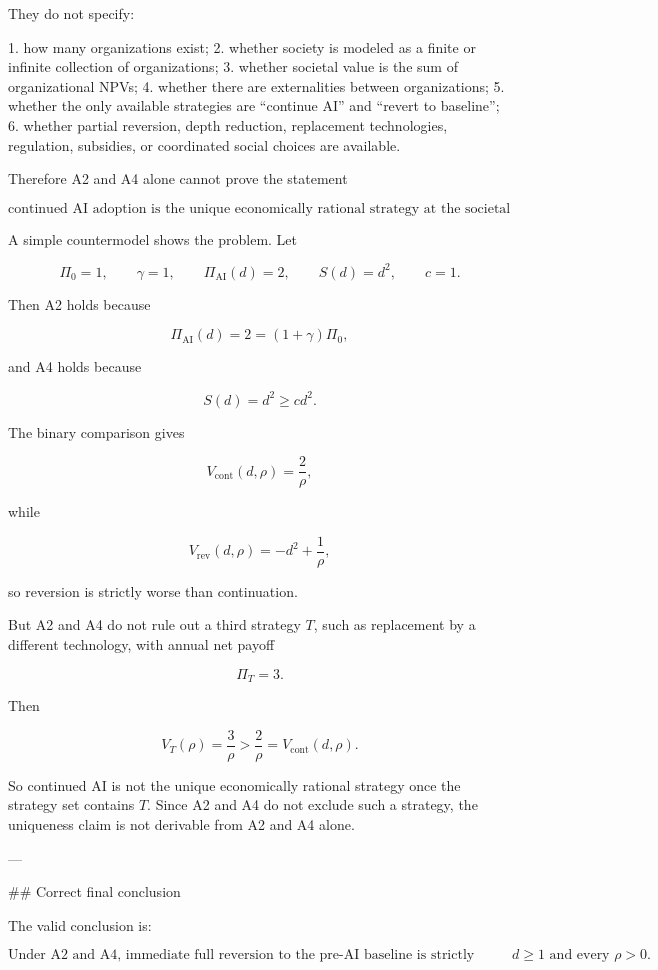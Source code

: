 They do not specify:

1. how many organizations exist;
2. whether society is modeled as a finite or infinite collection of organizations;
3. whether societal value is the sum of organizational NPVs;
4. whether there are externalities between organizations;
5. whether the only available strategies are “continue AI” and “revert to baseline”;
6. whether partial reversion, depth reduction, replacement technologies, regulation, subsidies, or coordinated social choices are available.

Therefore A2 and A4 alone cannot prove the statement

\[
\text{continued AI adoption is the unique economically rational strategy at the societal scale.}
\]

A simple countermodel shows the problem. Let

\[
\Pi_0=1,\qquad \gamma=1,\qquad \Pi_{\mathrm{AI}}(d)=2,\qquad S(d)=d^2,\qquad c=1.
\]

Then A2 holds because

\[
\Pi_{\mathrm{AI}}(d)=2=(1+\gamma)\Pi_0,
\]

and A4 holds because

\[
S(d)=d^2\ge cd^2.
\]

The binary comparison gives

\[
V_{\mathrm{cont}}(d,\rho)=\frac{2}{\rho},
\]

while

\[
V_{\mathrm{rev}}(d,\rho)
=
-d^2+\frac{1}{\rho},
\]

so reversion is strictly worse than continuation.

But A2 and A4 do not rule out a third strategy \(T\), such as replacement by a different technology, with annual net payoff

\[
\Pi_T=3.
\]

Then

\[
V_T(\rho)=\frac{3}{\rho}
>
\frac{2}{\rho}
=
V_{\mathrm{cont}}(d,\rho).
\]

So continued AI is not the unique economically rational strategy once the strategy set contains \(T\). Since A2 and A4 do not exclude such a strategy, the uniqueness claim is not derivable from A2 and A4 alone.

---

## Correct final conclusion

The valid conclusion is:

\[
\boxed{
\text{Under A2 and A4, immediate full reversion to the pre-AI baseline is strictly NPV-dominated by continued AI use for every } d\ge 1 \text{ and every } \rho>0.
}
\]

